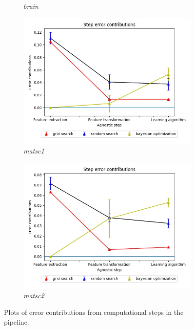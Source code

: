 \begin{figure}[H]
\begin{subfigure}{.5\textwidth}
  \caption{\textit{brain}}
  \label{fig:sfig2}
\end{subfigure}
\begin{subfigure}{.5\textwidth}
  \centering
  \includegraphics[scale=0.37]{img/EP/agnostic_error_step_matsc_dataset1}
  \caption{\textit{matsc1}}
  \label{fig:sfig3}
\end{subfigure}%
\begin{subfigure}{.5\textwidth}
  \centering
  \includegraphics[scale=0.37]{img/EP/agnostic_error_step_matsc_dataset2}
  \caption{\textit{matsc2}}
  \label{fig:sfig4}
\end{subfigure}

\caption{Plots of error contributions from computational steps in the pipeline.}
\label{fig:fig}
\end{figure}

